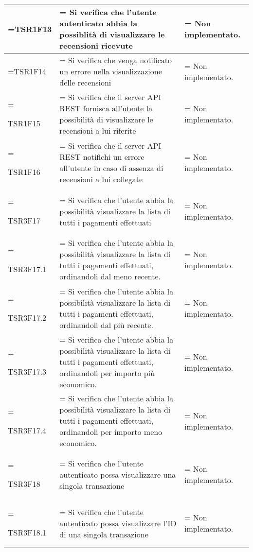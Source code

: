 \begin{xltabular}{\textwidth} {
        >{\hsize\linewidth=\hsize}X
        >{\hsize\linewidth=\hsize}X
        >{\hsize\linewidth=\hsize}X
    }
    TSR1F13 &
    Si verifica che l'utente autenticato abbia la possiblità di visualizzare le recensioni ricevute  &
    Non implementato.
    \\ \hline

    TSR1F14 &
    Si verifica che venga notificato un errore nella visualizzazione delle recensioni  &
    Non implementato.
    \\ \hline

    TSR1F15 &
    Si verifica che il server API REST fornisca all'utente la possibilità di visualizzare le recensioni a lui riferite &
    Non implementato.
    \\ \hline

    TSR1F16 &
    Si verifica che il server API REST notifichi un errore all'utente in caso di assenza di recensioni a lui collegate &
    Non implementato.
    \\ \hline


    TSR3F17 &
    Si verifica che l'utente abbia la possibilità visualizzare la lista di tutti i pagamenti
    effettuati &
    Non implementato.
    \\ \hline

    TSR3F17.1 &
    Si verifica che l'utente abbia la possibilità visualizzare la lista di tutti i pagamenti
    effettuati, ordinandoli dal meno recente. &
    Non implementato.
    \\ \hline

    TSR3F17.2 &
    Si verifica che l'utente abbia la possibilità visualizzare la lista di tutti i pagamenti
    effettuati, ordinandoli dal più recente. &
    Non implementato.
    \\ \hline

    TSR3F17.3 &
    Si verifica che l'utente abbia la possibilità visualizzare la lista di tutti i pagamenti
    effettuati, ordinandoli per importo più economico. &
    Non implementato.
    \\ \hline
    
    TSR3F17.4 &
    Si verifica che l'utente abbia la possibilità visualizzare la lista di tutti i pagamenti
    effettuati, ordinandoli per importo meno economico. &
    Non implementato.
    \\ \hline

    TSR3F18 &
    Si verifica che l'utente autenticato possa visualizzare una singola transazione &
    Non implementato.
    \\ \hline

    TSR3F18.1 &
    Si verifica che l'utente autenticato possa visualizzare l'ID di una singola transazione &
    Non implementato.
    \\ \hline



\end{xltabular}
